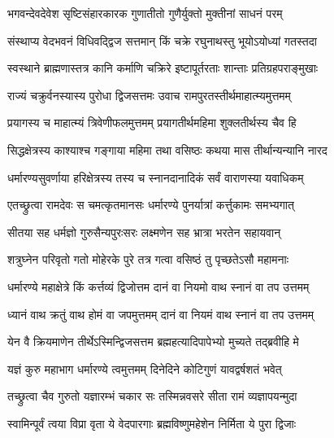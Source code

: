 \resetShloka


\twolineshloka
{भगवन्देवदेवेश सृष्टिसंहारकारक}
{गुणातीतो गुणैर्युक्तो मुक्तीनां साधनं परम्}%

\twolineshloka
{संस्थाप्य वेदभवनं विधिवद्द्विज सत्तमान्}
{किं चक्रे रघुनाथस्तु भूयोऽयोध्यां गतस्तदा}%


\twolineshloka
{स्वस्थाने ब्राह्मणास्तत्र कानि कर्माणि चक्रिरे}
{इष्टापूर्तरताः शान्ताः प्रतिग्रहपराङ्मुखाः}%

\twolineshloka
{राज्यं चक्रुर्वनस्यास्य पुरोधा द्विजसत्तमः}
{उवाच रामपुरतस्तीर्थमाहात्म्यमुत्तमम्}%

\twolineshloka
{प्रयागस्य च माहात्म्यं त्रिवेणीफलमुत्तमम्}
{प्रयागतीर्थमहिमा शुक्लतीर्थस्य चैव हि}%

\twolineshloka
{सिद्धक्षेत्रस्य काश्याश्च गङ्गाया महिमा तथा}
{वसिष्ठः कथया मास तीर्थान्यन्यानि नारद}%

\twolineshloka
{धर्मारण्यसुवर्णाया हरिक्षेत्रस्य तस्य च}
{स्नानदानादिकं सर्वं वाराणस्या यवाधिकम्}%

\twolineshloka
{एतच्छ्रुत्वा रामदेवः स चमत्कृतमानसः}
{धर्मारण्ये पुनर्यात्रां कर्त्तुकामः समभ्यगात्}%

\twolineshloka
{सीतया सह धर्मज्ञो गुरुसैन्यपुरःसरः}
{लक्ष्मणेन सह भ्रात्रा भरतेन सहायवान्}%

\twolineshloka
{शत्रुघ्नेन परिवृतो गतो मोहेरके पुरे}
{तत्र गत्वा वसिष्ठं तु पृच्छतेऽसौ महामनाः}%


\twolineshloka
{धर्मारण्ये महाक्षेत्रे किं कर्त्तव्यं द्विजोत्तम}
{दानं वा नियमो वाथ स्नानं वा तप उत्तमम्}%

\twolineshloka
{ध्यानं वाथ क्रतुं वाथ होमं वा जपमुत्तमम्}
{दानं वा नियमं वाथ स्नानं वा तप उत्तमम्}%

\twolineshloka
{येन वै क्रियमाणेन तीर्थेऽस्मिन्द्विजसत्तम}
{ब्रह्महत्यादिपापेभ्यो मुच्यते तद्ब्रवीहि मे}%


\twolineshloka
{यज्ञं कुरु महाभाग धर्मारण्ये त्वमुत्तमम्}
{दिनेदिने कोटिगुणं यावद्वर्षशतं भवेत्}%

\twolineshloka
{तच्छ्रुत्वा चैव गुरुतो यज्ञारम्भं चकार सः}
{तस्मिन्नवसरे सीता रामं व्यज्ञापयन्मुदा}%

\twolineshloka
{स्वामिन्पूर्वं त्वया विप्रा वृता ये वेदपारगाः}
{ब्रह्मविष्णुमहेशेन निर्मिता ये पुरा द्विजाः}%

